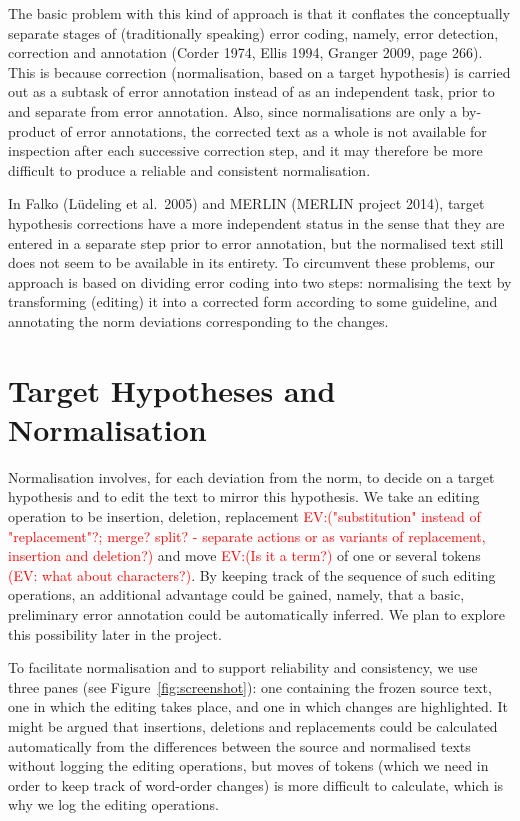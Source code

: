 \documentclass[10pt, a4paper]{article}
\begin{document}
The basic problem with this kind of approach is that it conflates the conceptually separate stages of (traditionally speaking) error coding, namely, error detection, correction and annotation (Corder 1974, Ellis 1994, Granger 2009, page 266). This is because correction (normalisation, based on a target hypothesis) is carried out as a subtask of error annotation instead of as an independent task, prior to and separate from error annotation. Also, since normalisations are only a by-product of error annotations, the corrected text as a whole is not available for inspection after each successive correction step, and it may therefore be more difficult to produce a reliable and consistent normalisation.

In Falko (L{\"u}deling et al.\ 2005) and MERLIN (MERLIN project 2014), target hypothesis corrections have a more independent status in the sense that they are entered in a separate step prior to error annotation, but the normalised text still does not seem to be available in its entirety. To circumvent these problems, our approach is based on dividing error coding into two steps: normalising the text by transforming (editing) it into a corrected form according to some guideline, and annotating the norm deviations corresponding to the changes.

\section{Target Hypotheses and Normalisation}

Normalisation involves, for each deviation from the norm, to decide on a target hypothesis and to edit the text to mirror this hypothesis. We take an editing operation to be insertion, deletion, replacement \textcolor{red}{EV:("substitution" instead of "replacement"?; merge? split? - separate actions or as variants of replacement, insertion and deletion?)} and move \textcolor{red}{EV:(Is it a term?)}
of one or several tokens \textcolor{red}{(EV: what about characters?)}. By keeping track of the sequence of such editing operations, an additional advantage could be gained, namely, that a basic, preliminary error annotation could be automatically inferred. We plan to explore this possibility later in the project.

To facilitate normalisation and to support reliability and consistency,
we use three panes (see Figure~\ref{fig:screenshot}): one containing the
frozen source text, one in which the editing takes place, and one in which
changes are highlighted. It might be argued that insertions, deletions and
replacements could be calculated automatically from the differences between
the source and normalised texts without logging the editing operations, but
moves of tokens (which we need in order to keep track of word-order changes)
is more difficult to calculate, which is why we log the editing operations.
\end{document}
